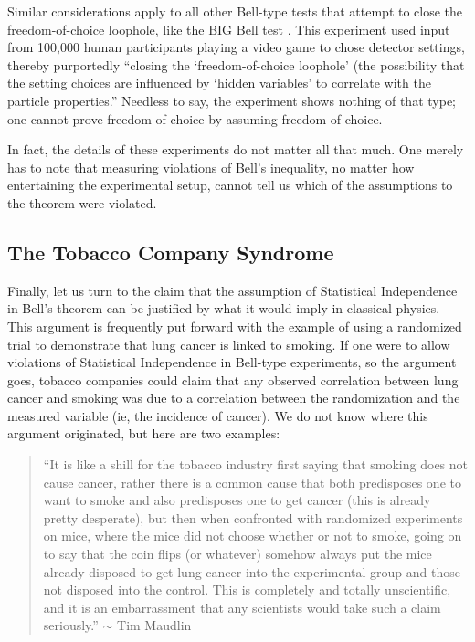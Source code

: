 \documentclass[12pt]{article}
\begin{document}
Similar considerations apply to all other Bell-type tests that attempt to close the freedom-of-choice loophole, like the {\sc BIG} Bell test \cite{bigbell}. This experiment used input from 100,000 human participants playing a video game to chose detector settings, thereby purportedly ``closing the ‘freedom-of-choice loophole’ (the possibility that the setting choices are influenced by ‘hidden variables’ to correlate with the particle properties.'' Needless to say, the experiment shows nothing of that type; one cannot prove freedom of choice by assuming freedom of choice. 

In fact, the details of these experiments do not matter all that much. One merely has to note that measuring violations of Bell's inequality, no matter how entertaining the experimental setup, cannot tell us which of the assumptions to the theorem were violated.


\subsection{The Tobacco Company Syndrome}

Finally, let us turn to the claim that the assumption of Statistical Independence in Bell's theorem can be justified by what it would imply in classical physics. This argument is frequently put forward with the example of using a randomized trial to demonstrate that lung cancer is linked to smoking. If one were to allow violations of Statistical Independence in Bell-type experiments, so the argument goes, tobacco companies could claim that any observed correlation between lung cancer and smoking was due to a correlation between the randomization and the measured variable (ie, the incidence of cancer). We do not know where this argument originated, but here are two examples: 
\begin{quote}
``It is like a shill for the tobacco industry first saying that smoking does not cause cancer, rather there is a common cause that both predisposes one to want to smoke and also predisposes one to get cancer (this is already pretty desperate), but then when confronted with randomized experiments on mice, where the mice did not choose whether or not to smoke, going on to say that the coin flips (or whatever) somehow always put the mice already disposed to get lung cancer into the experimental group and those not disposed into the control. This is completely and totally unscientific, and it is an embarrassment that any scientists would take such a claim seriously.''  $\sim$ Tim Maudlin \cite{Tobacco2}
\end{quote}
\end{document}
